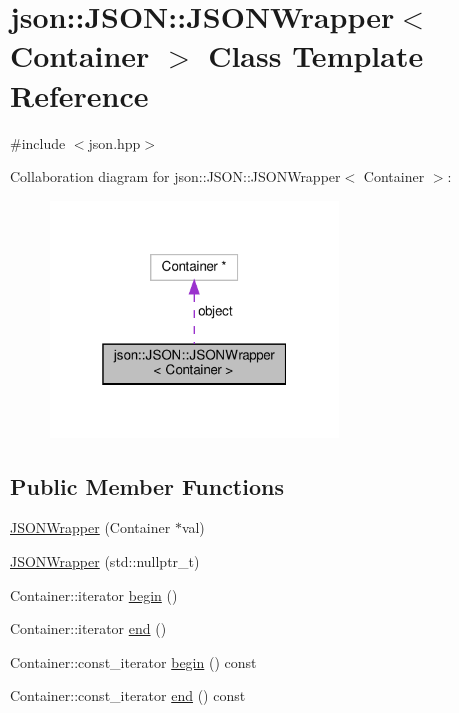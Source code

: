 \hypertarget{classjson_1_1_j_s_o_n_1_1_j_s_o_n_wrapper}{}\section{json\+:\+:J\+S\+ON\+:\+:J\+S\+O\+N\+Wrapper$<$ Container $>$ Class Template Reference}
\label{classjson_1_1_j_s_o_n_1_1_j_s_o_n_wrapper}


{\ttfamily \#include $<$json.\+hpp$>$}



Collaboration diagram for json\+:\+:J\+S\+ON\+:\+:J\+S\+O\+N\+Wrapper$<$ Container $>$\+:
\nopagebreak
\begin{figure}[H]
\begin{center}
\leavevmode
\includegraphics[width=217pt]{classjson_1_1_j_s_o_n_1_1_j_s_o_n_wrapper__coll__graph}
\end{center}
\end{figure}
\subsection*{Public Member Functions}
\begin{DoxyCompactItemize}
\item 
\mbox{\hyperlink{classjson_1_1_j_s_o_n_1_1_j_s_o_n_wrapper_a9a19ac6ec042875536887ab2917c15f4}{J\+S\+O\+N\+Wrapper}} (Container $\ast$val)
\item 
\mbox{\hyperlink{classjson_1_1_j_s_o_n_1_1_j_s_o_n_wrapper_a79602600f3d34881c6d4ea9d870b1213}{J\+S\+O\+N\+Wrapper}} (std\+::nullptr\+\_\+t)
\item 
Container\+::iterator \mbox{\hyperlink{classjson_1_1_j_s_o_n_1_1_j_s_o_n_wrapper_a86f4b41d1b0e923713be08f82aba402a}{begin}} ()
\item 
Container\+::iterator \mbox{\hyperlink{classjson_1_1_j_s_o_n_1_1_j_s_o_n_wrapper_aaedcc93307ac3f1abd057cd95c4418b3}{end}} ()
\item 
Container\+::const\+\_\+iterator \mbox{\hyperlink{classjson_1_1_j_s_o_n_1_1_j_s_o_n_wrapper_a8290666f91b9232eb6e3a2ffaad0949d}{begin}} () const
\item 
Container\+::const\+\_\+iterator \mbox{\hyperlink{classjson_1_1_j_s_o_n_1_1_j_s_o_n_wrapper_a83cf121e6c6f45bdd9a69cb133a8c867}{end}} () const
\end{DoxyCompactItemize}
